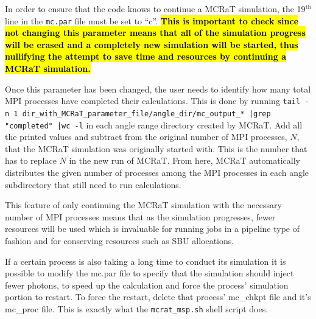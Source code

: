 \documentclass[12pt,a4paper]{article}
\begin{document}
 In order to ensure that the code knows to continue a MCRaT simulation, the 19$^\textrm{th}$ line in the \texttt{mc.par} file must be set to ``c''. \hl{\bf This is important to check since not changing this parameter means that all of the simulation progress will be erased and a completely new simulation will be started, thus nullifying the attempt to save time and resources by continuing a MCRaT simulation.} 
 
 Once this parameter has been changed, the user needs to identify how many total MPI processes have completed their calculations. This is done by running \texttt{tail -n 1 dir\_with\_MCRaT\_parameter\_file/angle\_dir/mc\_output\_* |grep "completed" |wc -l} in each angle range directory created by MCRaT. Add all the printed values and subtract from the original number of MPI processes, $N$, that the MCRaT simulation was originally started with. This is the number that has to replace $N$ in the new run of MCRaT. From here, MCRaT automatically distributes the given number of processes among the MPI processes in each angle subdirectory that still need to run calculations.
 
 This feature of only continuing the MCRaT simulation with the necessary number of MPI processes means that as the simulation progresses, fewer resources will be used which is invaluable for running jobs in a pipeline type of fashion and for conserving resources such as SBU allocations.
 
 If a certain process is also taking a long time to conduct its simulation it is possible to modify the mc.par file to specify that the simulation should inject fewer photons, to speed up the calculation and force the process' simulation portion to restart. To force the restart, delete that process' mc\_chkpt file and it's  mc\_proc file. This is exactly what the \texttt{mcrat\_msp.sh} shell script does. 
 
\end{document}
